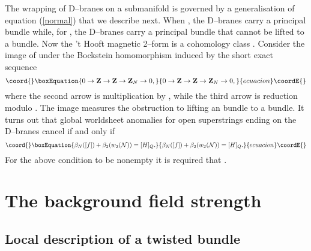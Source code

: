 \documentclass[a4paper,a4paper]{article}
\begin{document}
The wrapping of \coordHE{} D\coordHE{}--branes on a submanifold \coordHE{} is governed by a   
generalisation of equation (\ref{normal}) that we describe next. When  
\coordHE{},  the \coordHE{} D\coordHE{}--branes carry a \coordHE{} principal bundle while,  
for \coordHE{}, the D\coordHE{}--branes carry a principal \coordHE{} 
bundle that cannot be lifted  to a \coordHE{} bundle.
Now the 't Hooft magnetic 2--form is a cohomology class   
\coordHE{}. Consider the image of \myHighlight{$[f]$}\coordHE{} under  
the Bockstein homomorphism   
\coordHE{} induced by  
the short exact sequence  
\begin{equation}\coord{}\boxEquation{  
0\rightarrow{\bf Z}\rightarrow{\bf Z}\rightarrow{\bf Z}_N\rightarrow 0,  
\label{shortdue}
}{  
0\rightarrow{\bf Z}\rightarrow{\bf Z}\rightarrow{\bf Z}_N\rightarrow 0,  
}{ecuacion}\coordE{}\end{equation}  
where the second arrow is multiplication by \coordHE{}, while the  
third arrow is   
reduction modulo \coordHE{}. The image \coordHE{} measures   
the obstruction to lifting an \coordHE{} bundle  
to a \coordHE{} bundle.  
It turns out that global worldsheet anomalies for open superstrings   
ending on the D\coordHE{}--branes cancel if and only if
\begin{equation}\coord{}\boxEquation{  
\beta_N([f])+ \beta_2(w_2({\cal N}))=[H]_Q.  
\label{totalanomaly}
}{  
\beta_N([f])+ \beta_2(w_2({\cal N}))=[H]_Q.  
}{ecuacion}\coordE{}\end{equation}  
For the above condition to be nonempty it is required that \coordHE{}.

\section{The background field strength}\label{background}  

\subsection{Local description of a twisted bundle}\label{local}  
  
\end{document}
